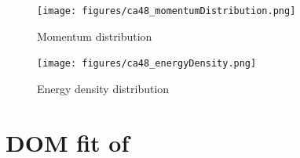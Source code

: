 \begin{figure}[H]
    \centering
    \texttt{[image: figures/ca48\_momentumDistribution.png]}
    \caption{Momentum distribution}
    \label{DOMFitData_ca48_momentumDistribution}
\end{figure}

\begin{figure}[H]
    \centering
    \texttt{[image: figures/ca48\_energyDensity.png]}
    \caption{Energy density distribution}
    \label{DOMFitData_ca48_energyDensity}
\end{figure}

\section{DOM fit of \niEight}

\label{ni58DOMOutput}
